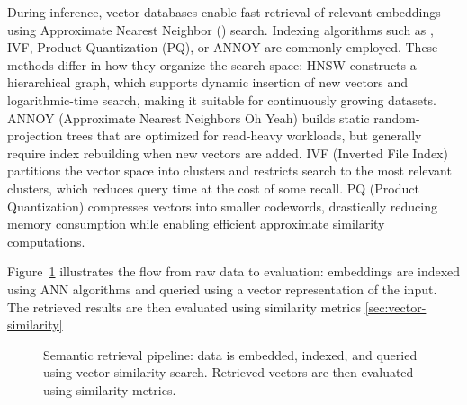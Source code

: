 During inference, vector databases enable fast retrieval of relevant embeddings using Approximate Nearest Neighbor () search. 
Indexing algorithms such as , IVF, Product Quantization (PQ), or ANNOY are commonly employed. 
These methods differ in how they organize the search space: 
\gls{HNSW} constructs a hierarchical graph, which supports dynamic insertion of new vectors and logarithmic-time search, making it suitable for continuously growing datasets. 
ANNOY (Approximate Nearest Neighbors Oh Yeah) builds static random-projection trees that are optimized for read-heavy workloads, but generally require index rebuilding when new vectors are added. 
IVF (Inverted File Index) partitions the vector space into clusters and restricts search to the most relevant clusters, which reduces query time at the cost of some recall. 
PQ (Product Quantization) compresses vectors into smaller codewords, drastically reducing memory consumption while enabling efficient approximate similarity computations. 

Figure~\ref{fig:semantic-search-pipeline} illustrates the flow from raw data to evaluation: embeddings are indexed using ANN algorithms and queried using a vector representation of the input. The retrieved results are then evaluated using similarity metrics \ref{sec:vector-similarity}
\begin{figure}[H]
    \centering
    \caption{Semantic retrieval pipeline: data is embedded, indexed, and queried using vector similarity search. Retrieved vectors are then evaluated using similarity metrics.}
    \label{fig:semantic-search-pipeline}
\end{figure}

